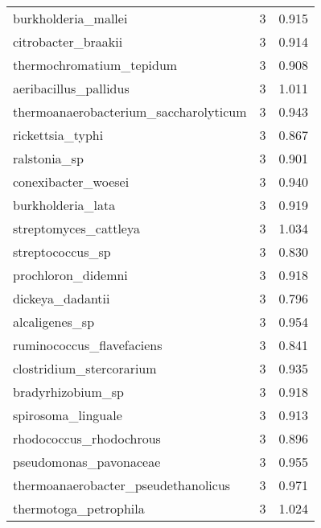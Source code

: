 \begin{tabular}{lrr}
                         burkholderia\_mallei &                   3 &     0.915 \\
                         citrobacter\_braakii &                   3 &     0.914 \\
                    thermochromatium\_tepidum &                   3 &     0.908 \\
                       aeribacillus\_pallidus &                   3 &     1.011 \\
       thermoanaerobacterium\_saccharolyticum &                   3 &     0.943 \\
                            rickettsia\_typhi &                   3 &     0.867 \\
                                ralstonia\_sp &                   3 &     0.901 \\
                         conexibacter\_woesei &                   3 &     0.940 \\
                           burkholderia\_lata &                   3 &     0.919 \\
                       streptomyces\_cattleya &                   3 &     1.034 \\
                            streptococcus\_sp &                   3 &     0.830 \\
                          prochloron\_didemni &                   3 &     0.918 \\
                            dickeya\_dadantii &                   3 &     0.796 \\
                              alcaligenes\_sp &                   3 &     0.954 \\
                   ruminococcus\_flavefaciens &                   3 &     0.841 \\
                    clostridium\_stercorarium &                   3 &     0.935 \\
                           bradyrhizobium\_sp &                   3 &     0.918 \\
                          spirosoma\_linguale &                   3 &     0.913 \\
                     rhodococcus\_rhodochrous &                   3 &     0.896 \\
                      pseudomonas\_pavonaceae &                   3 &     0.955 \\
         thermoanaerobacter\_pseudethanolicus &                   3 &     0.971 \\
                       thermotoga\_petrophila &                   3 &     1.024 \\

\end{tabular}

